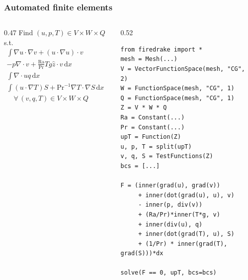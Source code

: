 \documentclass[presentation, 10pt]{beamer}
\begin{document}
\begin{frame}[fragile]
  \frametitle{Automated finite elements}
  \begin{columns}
    \begin{column}{0.47\framewidth}
      {\footnotesize
        Find $(u, p, T) \in V\times W\times Q$ s.t.
        \begin{align*}
          \int\!\nabla u \cdot \nabla v + (u \cdot \nabla u) \cdot v \\
          - p\nabla\cdot v + \frac{\text{Ra}}{\text{Pr}} Tg \hat{z} \cdot v\,\text{d}x &= 0 \\
          \int\!\nabla\cdot u q\,\text{d}x&= 0\\
          \int\! (u\cdot \nabla T) S + \text{Pr}^{-1} \nabla T \cdot \nabla
          S\,\text{d}x &= 0\\
          \quad \forall\, (v,q,T) \in V\times W \times Q
        \end{align*}
        }
    \end{column}
      \begin{column}{0.52\framewidth}
\begin{verbatim}
from firedrake import *
mesh = Mesh(...)
V = VectorFunctionSpace(mesh, "CG", 2)
W = FunctionSpace(mesh, "CG", 1)
Q = FunctionSpace(mesh, "CG", 1)
Z = V * W * Q
Ra = Constant(...)
Pr = Constant(...)
upT = Function(Z)
u, p, T = split(upT)
v, q, S = TestFunctions(Z)
bcs = [...]

F = (inner(grad(u), grad(v))
     + inner(dot(grad(u), u), v)
     - inner(p, div(v))
     + (Ra/Pr)*inner(T*g, v)
     + inner(div(u), q)
     + inner(dot(grad(T), u), S)
     + (1/Pr) * inner(grad(T), grad(S)))*dx

solve(F == 0, upT, bcs=bcs)
\end{verbatim}
      \end{column}
  \end{columns}
\end{frame}
\end{document}
